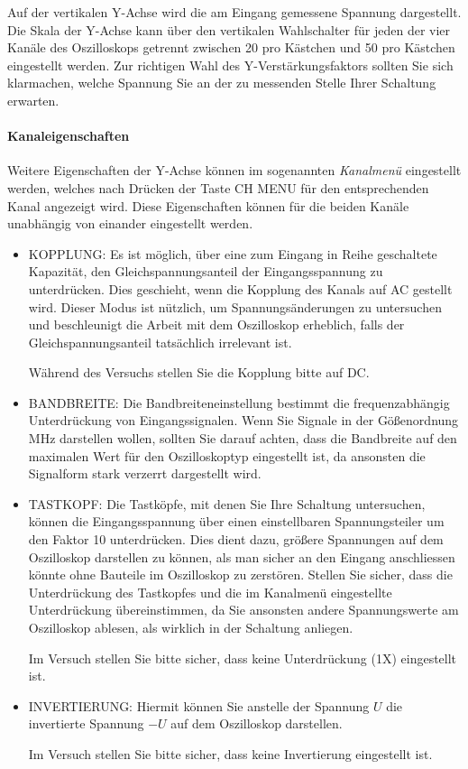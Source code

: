   Auf der vertikalen Y-Achse wird die am Eingang gemessene Spannung dargestellt. Die Skala der Y-Achse kann über den vertikalen Wahlschalter für jeden der vier Kanäle des Oszilloskops getrennt zwischen \unit{20}{\milli\volt} pro Kästchen und \unit{50}{\volt} pro Kästchen eingestellt werden. Zur richtigen Wahl des Y-Verstärkungsfaktors sollten Sie sich klarmachen, welche Spannung Sie an der zu messenden Stelle Ihrer Schaltung erwarten. 

  \paragraph{Kanaleigenschaften}
  Weitere Eigenschaften der Y-Achse können im sogenannten \textit{Kanalmenü} eingestellt werden, welches nach Drücken der Taste CH MENU für den entsprechenden Kanal angezeigt wird. Diese Eigenschaften können für die beiden Kanäle unabhängig von einander eingestellt werden. 
  \begin{itemize}
    \item KOPPLUNG: Es ist möglich, über eine zum Eingang in Reihe geschaltete Kapazität, den Gleichspannungsanteil der Eingangsspannung zu unterdrücken. Dies geschieht, wenn die Kopplung des Kanals auf AC gestellt wird. Dieser Modus ist nützlich, um Spannungsänderungen zu untersuchen und beschleunigt die Arbeit mit dem Oszilloskop erheblich,
      falls der Gleichspannungsanteil tats\"achlich irrelevant ist.
      \begin{hint}
        Während des Versuchs stellen Sie die Kopplung bitte auf DC.
      \end{hint}

    \item BANDBREITE: Die Bandbreiteneinstellung bestimmt die frequenzabhängig Unterdrückung von Eingangssignalen. Wenn Sie Signale in der Gößenordnung MHz darstellen wollen, sollten Sie darauf achten, dass die Bandbreite auf den maximalen Wert für den Oszilloskoptyp eingestellt ist, da ansonsten die Signalform stark verzerrt dargestellt wird.
    \item TASTKOPF: Die Tastköpfe, mit denen Sie Ihre Schaltung untersuchen, können die Eingangsspannung über einen einstellbaren Spannungsteiler um den Faktor 10 unterdrücken. Dies dient dazu, größere Spannungen auf dem Oszilloskop darstellen zu können, als man sicher an den Eingang anschliessen könnte ohne Bauteile im Oszilloskop zu zerstören. 
    Stellen Sie sicher, dass die Unterdrückung des Tastkopfes und die im Kanalmenü eingestellte Unterdrückung übereinstimmen, da Sie ansonsten andere Spannungswerte am Oszilloskop ablesen, als wirklich in der Schaltung anliegen.
			\begin{hint}
				Im Versuch stellen Sie bitte sicher, dass keine Unterdrückung (1X) eingestellt ist.
			\end{hint}
    \item INVERTIERUNG: Hiermit können Sie anstelle der Spannung $U$ die invertierte Spannung $-U$ auf dem Oszilloskop darstellen. 
			\begin{hint}
				Im Versuch stellen Sie bitte sicher, dass keine Invertierung eingestellt ist.
			\end{hint}
  \end{itemize}

